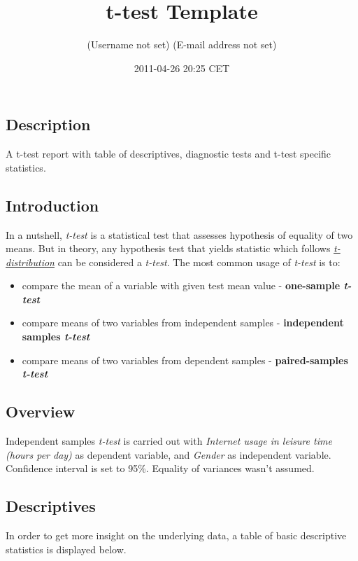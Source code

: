 \documentclass[]{article}
\title{t-test Template}
\author{(Username not set) (E-mail address not set)}
\date{2011-04-26 20:25 CET}
\begin{document}
\maketitle

\subsection{Description}

A t-test report with table of descriptives, diagnostic tests and t-test
specific statistics.

\subsection{Introduction}

In a nutshell, \emph{t-test} is a statistical test that assesses
hypothesis of equality of two means. But in theory, any hypothesis test
that yields statistic which follows
\href{https://en.wikipedia.org/wiki/Student\%27s\_t-distribution}{\emph{t-distribution}}
can be considered a \emph{t-test}. The most common usage of
\emph{t-test} is to:

\begin{itemize}
\item
  compare the mean of a variable with given test mean value -
  \textbf{one-sample \emph{t-test}}
\item
  compare means of two variables from independent samples -
  \textbf{independent samples \emph{t-test}}
\item
  compare means of two variables from dependent samples -
  \textbf{paired-samples \emph{t-test}}
\end{itemize}
\subsection{Overview}

Independent samples \emph{t-test} is carried out with \emph{Internet
usage in leisure time (hours per day)} as dependent variable, and
\emph{Gender} as independent variable. Confidence interval is set to
95\%. Equality of variances wasn't assumed.

\subsection{Descriptives}

In order to get more insight on the underlying data, a table of basic
descriptive statistics is displayed below.
\end{document}
